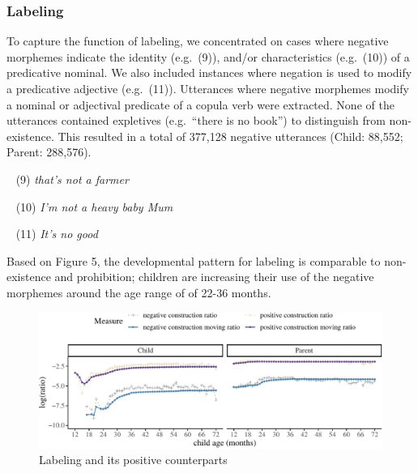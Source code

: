 \documentclass[
  english,
  man,floatsintext]{apa6}
\begin{document}
\clearpage

\hypertarget{labeling}{%
\subsubsection{Labeling}\label{labeling}}

To capture the function of labeling, we concentrated on cases where negative morphemes indicate the identity (e.g.~(9)), and/or characteristics (e.g.~(10)) of a predicative nominal. We also included instances where negation is used to modify a predicative adjective (e.g.~(11)). Utterances where negative morphemes modify a nominal or adjectival predicate of a copula verb were extracted. None of the utterances contained expletives (e.g.~\enquote{there is no book}) to distinguish from non-existence. This resulted in a total of 377,128 negative utterances (Child: 88,552; Parent: 288,576).

~
(9) \emph{that's not a farmer}

~
(10) \emph{I'm not a heavy baby Mum}

~
(11) \emph{It's no good}

Based on Figure 5, the developmental pattern for labeling is comparable to non-existence and prohibition; children are increasing their use of the negative morphemes around the age range of of 22-36 months.

\begin{figure}[H]

{\centering \includegraphics{neg_construction_article_files/figure-latex/learning-1} 

}

\caption{Labeling and its positive counterparts}\label{fig:learning}
\end{figure}

\clearpage
\end{document}

